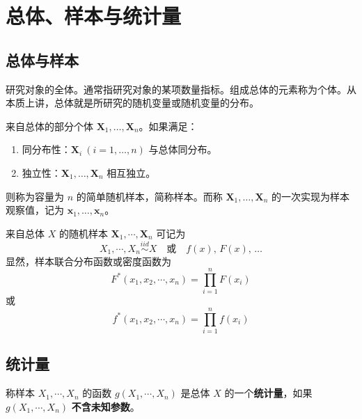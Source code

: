 \section{总体、样本与统计量}
\subsection{总体与样本}
\begin{definition}[总体]
研究对象的全体。通常指研究对象的某项数量指标。组成总体的元素称为个体。从本质上讲，总体就是所研究的随机变量或随机变量的分布。
\end{definition}

\begin{definition}[样本（简单随机样本）]
来自总体的部分个体 $\mathbf{X}_1, \dots, \mathbf{X}_n$。如果满足：
\begin{enumerate}
	\item 同分布性：$\mathbf{X}_i\ (i=1,\dots,n)$ 与总体同分布。
	\item 独立性：$\mathbf{X}_1, \dots, \mathbf{X}_n$ 相互独立。
\end{enumerate}
则称为容量为 $n$ 的简单随机样本，简称样本。而称 $\mathbf{X}_1, \dots, \mathbf{X}_n$ 的一次实现为样本观察值，记为 $\mathbf{x}_1, \dots, \mathbf{x}_n$。

来自总体 $X$ 的随机样本 $\mathbf{X}_1, \cdots, \mathbf{X}_n$ 可记为
\begin{equation}
	X_1, \cdots, X_n \overset{iid}{\sim} X \quad \text{或} \quad f(x),\, F(x),\, \dots
	\label{eq:基本概念:样本记号}
\end{equation}
显然，样本联合分布函数或密度函数为
\begin{equation}
	F^*(x_1, x_2, \cdots, x_n) = \prod_{i=1}^{n} F(x_i)
	\label{eq:基本概念:联合分布函数}
\end{equation}
或
\begin{equation}
	f^*(x_1, x_2, \cdots, x_n) = \prod_{i=1}^{n} f(x_i)
	\label{eq:基本概念:联合密度}
\end{equation}
\end{definition}

\subsection{统计量}
\begin{definition}[统计量]
称样本 $X_1, \cdots, X_n$ 的函数 $g(X_1, \cdots, X_n)$ 是总体 $X$ 的一个\textbf{统计量}，如果 $g(X_1, \cdots, X_n)$ \textbf{不含未知参数}。
\end{definition}

